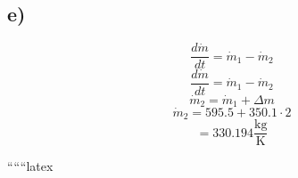

\subsection*{e)}
\[
\frac{d\dot{m}}{dt} = \dot{m}_1 - \dot{m}_2
\]
\[
\frac{d\dot{m}}{dt} = \dot{m}_1 - \dot{m}_2
\]
\[
\dot{m}_2 = \dot{m}_1 + \Delta m
\]
\[
\dot{m}_2 = 595.5 + 350.1 \cdot 2
\]
\[
= 330.194 \frac{\text{kg}}{\text{K}}
\]

``````latex